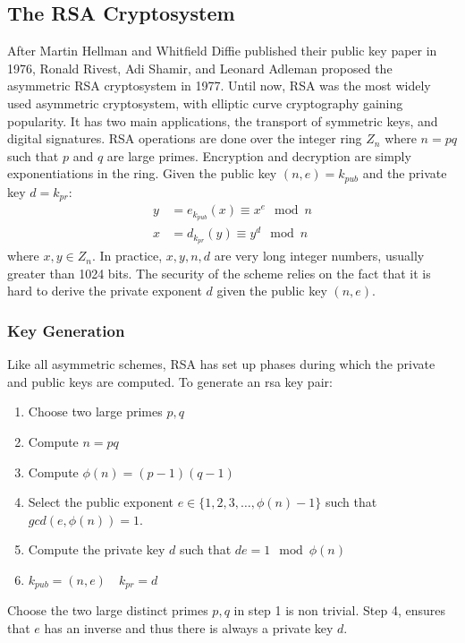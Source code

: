 \documentclass{math}
\begin{document}
\subsection*{The RSA Cryptosystem}
After Martin Hellman and Whitfield Diffie published their public key paper in
1976, Ronald Rivest, Adi Shamir, and Leonard Adleman proposed the asymmetric
RSA cryptosystem in 1977. Until now, RSA was the most widely used asymmetric
cryptosystem, with elliptic curve cryptography gaining popularity. It has two
main applications, the transport of symmetric keys, and digital signatures.
RSA operations are done over the integer ring \( Z_n \) where \( n = pq \)
such that \( p \) and \( q \) are large primes. Encryption and decryption are
simply exponentiations in the ring. Given the public key \( (n,e) = k_{pub} \)
and the private key \( d = k_{pr} \):
\begin{align*}
  y &= e_{k_{pub}}(x) \equiv x^e\mod n \\
  x &= d_{k_{pr}}(y) \equiv y^d\mod n
\end{align*}
where \( x,y \in Z_n \). In practice, \( x,y,n,d \) are very long integer
numbers, usually greater than 1024 bits. The security of the scheme relies on
the fact that it is hard to derive the private exponent \( d \) given the
public key \( (n,e) \).

\subsubsection*{Key Generation}
Like all asymmetric schemes, RSA has set up phases during which the private and
public keys are computed. To generate an rsa key pair:
\begin{enumerate}
  \item Choose two large primes \( p,q \)
  \item Compute \( n = pq \)
  \item Compute \( \phi(n) = (p-1)(q-1) \)
  \item Select the public exponent \( e\in\{1,2,3,\dots,\phi(n)-1\} \) such that
  \( gcd(e,\phi(n)) = 1 \).
  \item Compute the private key \( d \) such that \( de = 1\mod\phi(n) \)
  \item \( k_{pub} = (n,e) \quad k_{pr} = d \)
\end{enumerate}
Choose the two large distinct primes \( p,q \) in step 1 is non trivial. Step
4, ensures that \( e \) has an inverse and thus there is always a private key
\( d \).
\end{document}
